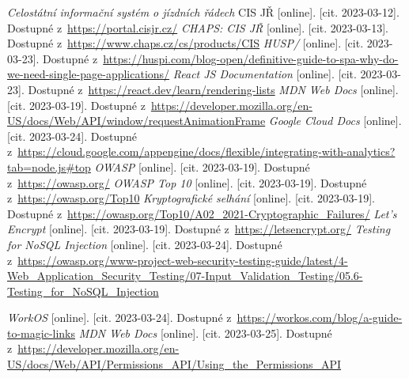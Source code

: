 \begin{thebibliography}{99}
     \textit{Celostátní informační systém o jízdních řádech} CIS JŘ [online]. [cit. 2023-03-12]. Dostupné z~\url{https://portal.cisjr.cz/}
     \textit{CHAPS: CIS JŘ} [online]. [cit. 2023-03-13]. Dostupné z~\url{https://www.chaps.cz/cs/products/CIS}
     \textit{HUSP/} [online]. [cit. 2023-03-23]. Dostupné z~\url{https://huspi.com/blog-open/definitive-guide-to-spa-why-do-we-need-single-page-applications/}
     \textit{React JS Documentation} [online]. [cit. 2023-03-23]. Dostupné z~\url{https://react.dev/learn/rendering-lists}
     \textit{MDN Web Docs} [online]. [cit. 2023-03-19]. Dostupné z~\url{https://developer.mozilla.org/en-US/docs/Web/API/window/requestAnimationFrame}
     \textit{Google Cloud Docs} [online]. [cit. 2023-03-24]. Dostupné z~\url{https://cloud.google.com/appengine/docs/flexible/integrating-with-analytics?tab=node.js#top}
     \textit{OWASP} [online]. [cit. 2023-03-19]. Dostupné z~\url{https://owasp.org/}
     \textit{OWASP Top 10} [online]. [cit. 2023-03-19]. Dostupné z~\url{https://owasp.org/Top10}
     \textit{Kryptografické selhání} [online]. [cit. 2023-03-19]. Dostupné z~\url{https://owasp.org/Top10/A02_2021-Cryptographic_Failures/}
     \textit{Let's Encrypt} [online]. [cit. 2023-03-19]. Dostupné z~\url{https://letsencrypt.org/}
     \textit{Testing for NoSQL Injection} [online]. [cit. 2023-03-24]. Dostupné z~\url{https://owasp.org/www-project-web-security-testing-guide/latest/4-Web_Application_Security_Testing/07-Input_Validation_Testing/05.6-Testing_for_NoSQL_Injection}

     \textit{WorkOS} [online]. [cit. 2023-03-24]. Dostupné z~\url{https://workos.com/blog/a-guide-to-magic-links}
     \textit{MDN Web Docs} [online]. [cit. 2023-03-25]. Dostupné z~\url{https://developer.mozilla.org/en-US/docs/Web/API/Permissions_API/Using_the_Permissions_API}

\end{thebibliography}